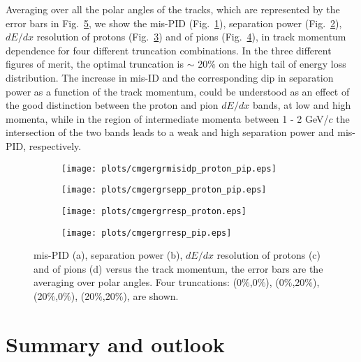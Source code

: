 Averaging over all the polar angles of the tracks, which are represented by the error bars in Fig.~\ref{fig.3.8}, we show the mis-PID (Fig.~\ref{fig.3.8.a}), separation power (Fig.~\ref{fig.3.8.b}), $dE/dx$ resolution of protons (Fig.~\ref{fig.3.8.c}) and of pions (Fig.~\ref{fig.3.8.d}), in track momentum dependence for four different truncation combinations. In the three different figures of merit, the optimal truncation is $\sim$ 20$\%$ on the high tail of energy loss distribution. The increase in mis-ID and the corresponding dip in separation power as a function of the track momentum, could be understood as an effect of the good distinction between the proton and pion $dE/dx$ bands, at low and high momenta, while in the region of intermediate momenta between 1 - 2 GeV/$c$ the intersection of the two bands leads to a weak and high separation power and mis-PID, respectively.
\begin{center}
\null
\vfill
\begin{figure}[htbp]
    \centering
    \begin{subfigure}[b]{0.5\textwidth}
        \texttt{[image: plots/cmgergrmisidp\_proton\_pip.eps]}
        \caption{}
        \label{fig.3.8.a} 
    \end{subfigure}\hfill
    \begin{subfigure}[b]{0.5\textwidth}
        \texttt{[image: plots/cmgergrsepp\_proton\_pip.eps]}
        \caption{}
        \label{fig.3.8.b} 
    \end{subfigure}\hfill
    \begin{subfigure}[b]{0.5\textwidth}
        \texttt{[image: plots/cmgergrresp\_proton.eps]}
        \caption{}
        \label{fig.3.8.c} 
    \end{subfigure}\hfill
    \begin{subfigure}[b]{0.5\textwidth}
        \texttt{[image: plots/cmgergrresp\_pip.eps]}
        \caption{}
        \label{fig.3.8.d}
    \end{subfigure}
    \caption{mis-PID (a), separation power (b), $dE/dx$ resolution of protons (c) and of pions (d) versus the track momentum, the error bars are the averaging over polar angles. Four truncations: (0$\%$,0$\%$), (0$\%$,20$\%$),(20$\%$,0$\%$), (20$\%$,20$\%$), are shown.}
    \label{fig.3.8}
\end{figure}
\null
\vfill
\end{center}

\section{Summary and outlook}
\label{p.3.4}

